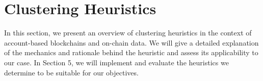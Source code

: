 \documentclass[12pt,a4paper,titlepage,oneside,english]{article}
\begin{document}

\fi


\section{Clustering Heuristics}
In this section, we present an overview of clustering heuristics in the context of account-based blockchains and on-chain data. We will give a detailed explanation of the mechanics and rationale behind the heuristic and assess its applicability to our case. 
In Section 5, we will implement and evaluate the heuristics we determine to be suitable for our objectives.

\end{document}

